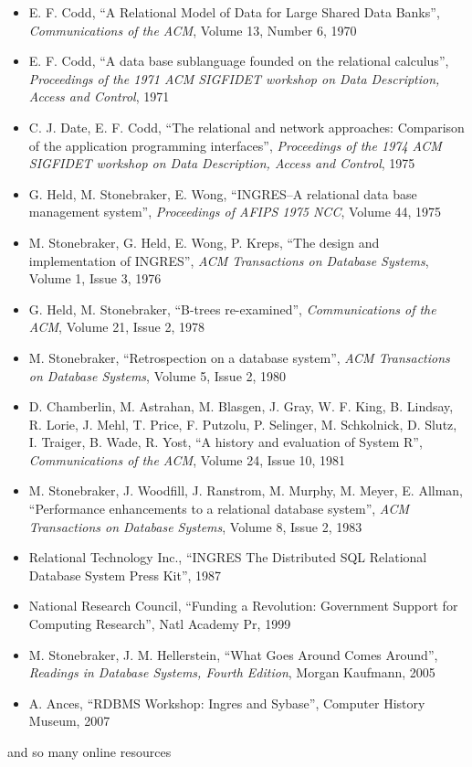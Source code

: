 \begin{itemize}
 \item E. F. Codd, ``A Relational Model of Data for Large Shared Data
       Banks'', {\it Communications of the ACM}, Volume 13, Number 6,
       1970
 \item E. F. Codd, ``A data base sublanguage founded on the relational
       calculus'', {\it Proceedings of the 1971 ACM SIGFIDET workshop
       on Data Description, Access and Control}, 1971
 \item C. J. Date, E. F. Codd, ``The relational and network approaches: Comparison of the
       application programming interfaces'', {\it Proceedings of the
       1974 ACM SIGFIDET workshop on Data Description, Access and
       Control}, 1975
 \item G. Held, M. Stonebraker, E. Wong, ``INGRES--A relational data
       base management system'', {\it Proceedings of AFIPS 1975 NCC},
       Volume 44, 1975
 \item M. Stonebraker, G. Held, E. Wong, P. Kreps, ``The design and
       implementation of INGRES'', {\it ACM Transactions on Database
       Systems}, Volume 1, Issue 3, 1976
 \item G. Held, M. Stonebraker, ``B-trees re-examined'', {\it Communications of the
       ACM}, Volume 21, Issue 2, 1978
 \item M. Stonebraker, ``Retrospection on a database system'', {\it ACM
       Transactions on Database Systems}, Volume 5, Issue 2, 1980
 \item D. Chamberlin, M. Astrahan, M. Blasgen, J. Gray, W. F. King,
       B. Lindsay, R. Lorie, J. Mehl, T. Price, F. Putzolu, P. Selinger,
       M. Schkolnick, D. Slutz, I. Traiger, B. Wade, R. Yost, ``A
       history and evaluation of System R'', {\it Communications of the
       ACM}, Volume 24, Issue 10, 1981
 \item M. Stonebraker, J. Woodfill, J. Ranstrom, M. Murphy, M. Meyer,
       E. Allman, ``Performance enhancements to a relational database
       system'', {\it ACM Transactions on Database Systems}, Volume 8,
       Issue 2, 1983
 \item Relational Technology Inc., ``INGRES The Distributed SQL
       Relational Database System Press Kit'', 1987
 \item National Research Council, ``Funding a Revolution: Government
       Support for Computing Research'', Natl Academy Pr, 1999
 \item M. Stonebraker, J. M. Hellerstein, ``What Goes Around Comes
       Around'', {\it Readings in Database Systems, Fourth Edition},
       Morgan Kaufmann, 2005
 \item A. Ances, ``RDBMS Workshop: Ingres and Sybase'', Computer
       History Museum, 2007
\end{itemize}


and so many online resources


\normalsize
